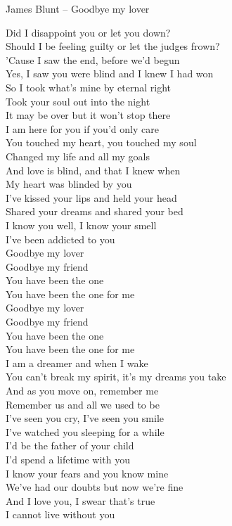 \documentclass{novel}
\begin{document}
\newpage
\normalsize
\h*{James Blunt – Goodbye my lover}
\begin{multicols}{2}
Did I disappoint you or let you down? \\
Should I be feeling guilty or let the judges frown? \\
'Cause I saw the end, before we'd begun \\
Yes, I saw you were blind and I knew I had won \\
So I took what's mine by eternal right \\
Took your soul out into the night \\
It may be over but it won't stop there \\
I am here for you if you'd only care \\
You touched my heart, you touched my soul \\
Changed my life and all my goals \\
And love is blind, and that I knew when \\
My heart was blinded by you \\
I've kissed your lips and held your head \\
Shared your dreams and shared your bed \\
I know you well, I know your smell \\
I've been addicted to you \\

Goodbye my lover \\
Goodbye my friend \\
You have been the one \\
You have been the one for me \\
Goodbye my lover \\
Goodbye my friend \\
You have been the one \\
You have been the one for me \\

I am a dreamer and when I wake \\
You can't break my spirit, it's my dreams you take \\
And as you move on, remember me \\
Remember us and all we used to be \\
I've seen you cry, I've seen you smile \\
I've watched you sleeping for a while \\
I'd be the father of your child \\
I'd spend a lifetime with you \\
I know your fears and you know mine \\
We've had our doubts but now we're fine \\
And I love you, I swear that's true \\
I cannot live without you \\


\end{multicols}
\end{document}
